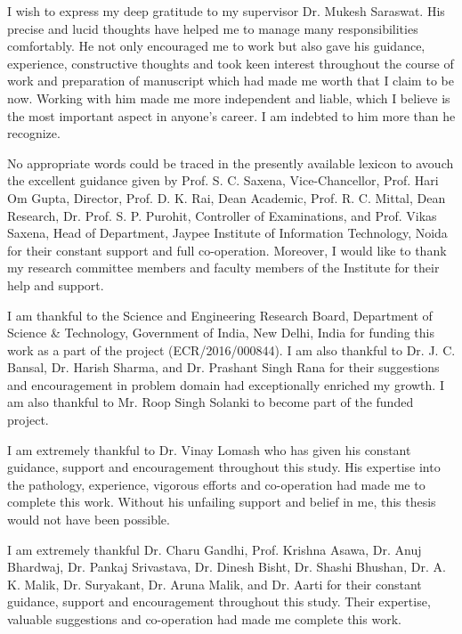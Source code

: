 

\begin{acknowledgements}

I wish to express my deep gratitude to my supervisor Dr. Mukesh Saraswat. His precise and lucid thoughts have helped me to manage many responsibilities comfortably. He not only encouraged me to work but also gave his guidance, experience, constructive thoughts and took keen interest throughout the course of work and preparation of manuscript which had made me worth that I claim to be now. Working with him made me more independent and liable, which I believe is the most important aspect in anyone's career. I am indebted to him more than he recognize.

	No appropriate words could be traced in the presently available lexicon to avouch the excellent guidance given by Prof. S. C. Saxena, Vice-Chancellor, Prof. Hari Om Gupta, Director, Prof. D. K. Rai, Dean Academic, Prof. R. C. Mittal, Dean Research, Dr. Prof. S. P. Purohit, Controller of Examinations, and Prof. Vikas Saxena, Head of Department, Jaypee Institute of Information Technology, Noida for their constant support and full co-operation. Moreover, I would like to thank my research committee members and faculty members of the Institute for their help and support.

	 I am thankful to the Science and Engineering Research Board, Department of Science \& Technology, Government of India, New Delhi, India for funding this work as a part of the project (ECR/2016/000844). I am also thankful to Dr. J. C. Bansal, Dr. Harish Sharma, and Dr. Prashant Singh Rana for their suggestions and encouragement in problem domain had exceptionally enriched my growth. I am also thankful to Mr. Roop Singh Solanki to become part of the funded project.

	I am extremely thankful to Dr. Vinay Lomash who has given his constant guidance, support and encouragement throughout this study.  His expertise into the pathology, experience, vigorous efforts and co-operation had made me to complete this work. Without his unfailing support and belief in me, this thesis would not have been possible.

	I am extremely thankful Dr. Charu Gandhi, Prof. Krishna Asawa, Dr. Anuj Bhardwaj, Dr. Pankaj Srivastava, Dr. Dinesh Bisht, Dr. Shashi Bhushan, Dr. A. K. Malik, Dr. Suryakant, Dr. Aruna Malik, and Dr. Aarti   for their constant guidance, support and encouragement throughout this study. Their expertise, valuable suggestions and co-operation had made me complete this work.
	

\end{acknowledgements}
